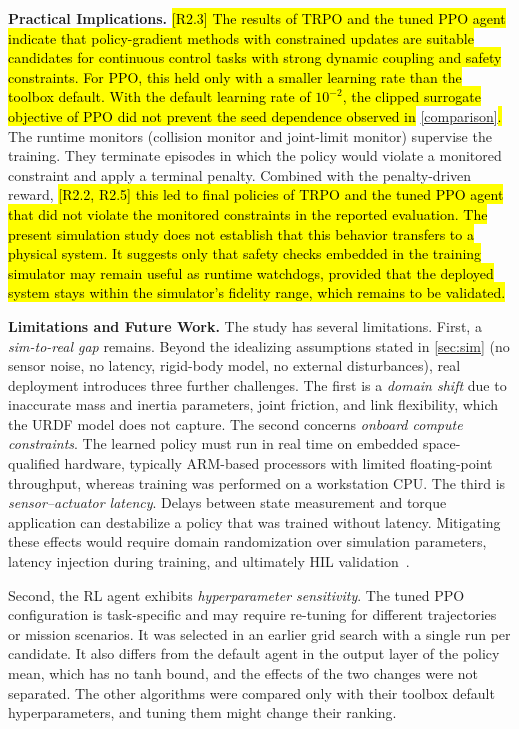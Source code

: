 \documentclass{ieeeaccess}
\newcommand{\hlone}[1]{{\sethlcolor{rone}\hl{#1}}}
\begin{document}
\textbf{Practical Implications.} \hlone{[R2.3] The results of TRPO and the tuned PPO agent indicate that
policy-gradient methods with constrained updates are suitable candidates for continuous control tasks
with strong dynamic coupling and safety constraints. For PPO, this held only with a smaller learning rate
than the toolbox default. With the default learning rate of $10^{-2}$, the clipped surrogate objective of
PPO did not prevent the seed dependence observed in} \cref{comparison}\hlone{.} The runtime
monitors (collision monitor and joint-limit monitor) supervise the training. They terminate episodes in
which the policy would violate a monitored constraint and apply a terminal penalty.
Combined with the penalty-driven reward, \hlone{[R2.2, R2.5] this led to final policies of TRPO and the
tuned PPO agent that did not violate the monitored constraints in the reported evaluation. The present
simulation study does not establish that this behavior transfers to a physical system. It suggests only
that safety checks embedded in the training simulator may remain useful as runtime watchdogs, provided
that the deployed system stays within the simulator's fidelity range, which remains to be validated.}



\textbf{Limitations and Future Work.} The study has several limitations. First, a \emph{sim-to-real gap}
remains. Beyond the idealizing assumptions stated in \cref{sec:sim} (no sensor noise, no latency,
rigid-body model, no external disturbances), real deployment introduces three further challenges. The
first is a \emph{domain shift} due to inaccurate mass and inertia parameters, joint friction, and link
flexibility, which the URDF model does not capture. The second concerns \emph{onboard compute
constraints}. The learned policy must run in real time on embedded space-qualified hardware, typically
ARM-based processors with limited floating-point throughput, whereas training was performed on a
workstation CPU. The third is \emph{sensor--actuator latency}. Delays between state measurement and
torque application can destabilize a policy that was trained without latency. Mitigating these effects
would require domain randomization over simulation parameters, latency injection during training, and
ultimately HIL validation~\cite{b8}.

Second, the RL agent exhibits \emph{hyperparameter sensitivity}. The tuned PPO configuration is
task-specific and may require re-tuning for different trajectories or mission scenarios. It
was selected in an earlier grid search with a single run per candidate. It also differs from
the default agent in the output layer of the policy mean, which has no tanh bound, and the effects of the
two changes were not separated. The other algorithms were compared only with their toolbox
default hyperparameters, and tuning them might change their ranking.
\end{document}
